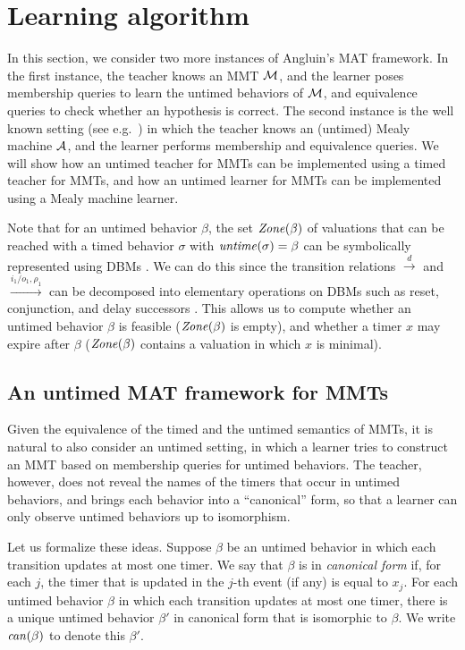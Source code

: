 \section{Learning algorithm}  
\label{algorithm}
In this section, we consider two more instances of Angluin's MAT framework.
In the first instance, the teacher knows an MMT ${\mathcal M}$, and the learner poses membership queries
to learn the untimed behaviors of ${\mathcal M}$, and equivalence queries to check whether an hypothesis is correct.
The second instance is the well known setting (see e.g.\ \cite{Nie03,RSBM09}) 
in which the teacher knows an (untimed) Mealy machine ${\mathcal A}$,
and the learner performs membership and equivalence queries.
%
We will show how an untimed teacher for MMTs can be implemented using a timed teacher for MMTs,
and how an untimed learner for MMTs can be implemented using a Mealy machine learner.

\ifshort
Note that for an untimed behavior $\beta$, the set $\mathit{Zone}({\beta})$ of valuations that can be reached with a timed behavior $\sigma$ with $\mathit{untime}(\sigma) = \beta$ can be symbolically represented using DBMs \cite{Di89}.
We can do this since the transition relations $\xrightarrow{d}$ and $\xrightarrow{i_1/o_1, \rho_1}$ can be decomposed 
into elementary operations on DBMs such as reset, conjunction, and delay successors \cite{BengtssonY03}.
This allows us to compute whether an untimed behavior $\beta$ is feasible ($\mathit{Zone}({\beta})$ is empty), and
whether a timer $x$ may expire after $\beta$ ($\mathit{Zone}({\beta})$ contains a valuation in which $x$ is minimal).
\fi

\subsection{An untimed MAT framework for MMTs}
Given the equivalence of the timed and the untimed semantics of MMTs, it is natural to also 
consider an untimed setting, in which a learner tries to construct an MMT based on membership queries for untimed behaviors.
The teacher, however, does not reveal the names of the timers that occur in untimed behaviors, and brings each behavior into a
``canonical'' form, so that a learner can only observe untimed behaviors up to isomorphism.

Let us formalize these ideas.
Suppose $\beta$ be an untimed behavior in which each transition updates at most one timer.
We say that $\beta$ is in \emph{canonical form} if, for each $j$, the timer that is updated in the $j$-th event
(if any) is equal to $x_j$.
For each untimed behavior $\beta$ in which each transition updates at most one timer, there is a unique untimed behavior
$\beta'$ in canonical form that is isomorphic to $\beta$.
We write $\mathit{can}({\beta})$ to denote this $\beta'$.

